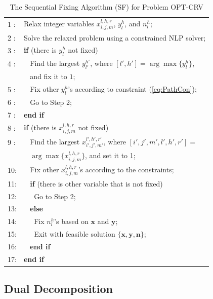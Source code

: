 \documentclass[12pt,onecolumn,draftclsnofoot]{IEEEtran} %
\begin{document}
\begin{table}[!t]
\begin{center}
\caption{The Sequential Fixing Algorithm (SF) for Problem OPT-CRV}
\begin{tabular}{ll}
\hline
1 : & Relax integer variables $x_{i,j,m}^{l,h,r}$, $y_l^h$, and $n_l^h$; \\ 
2 : & Solve the relaxed problem using a constrained NLP solver; \\ 
3 : & {\bf if} (there is $y_l^h$ not fixed) \\
4 : & $\;\;$ Find the largest $y_{l'}^{h'}$, where $[l',h']=\arg \max\{y_l^h\}$, \\
    & $\;\;$ and fix it to $1$; \\
5 : & $\;\;$ Fix other $y_l^h$'s according to constraint (\ref{eq:PathCon}); \\
6 : & $\;\;$ Go to Step 2; \\ 
7 : & {\bf end if} \\
8 : & {\bf if} (there is $x_{i,j,m}^{l,h,r}$ not fixed) \\
9 : & $\;\;$ Find the largest $x_{i',j',m'}^{l',h',r'}$, where $[i',j',m',l',h',r']=$ \\
    & $\;\;$ $\arg \max\{x_{i,j,m}^{l,h,r}\}$, and set it to 1; \\
10: & $\;\;$ Fix other $x_{i,j,m}^{l,h,r}$'s according to the constraints; \\
11: & $\;\;$ {\bf if} (there is other variable that is not fixed) \\
12: & $\;\;\;\;$ Go to Step 2; \\
13: & $\;\;$ {\bf else} \\
14: & $\;\;\;\;$ Fix $n_l^h$'s based on $\mathbf{x}$ and $\mathbf{y}$; \\
15: & $\;\;\;\;$ Exit with feasible solution $\{\mathbf{x}, \mathbf{y},\mathbf{n}\}$; \\
16: & $\;\;$ {\bf end if} \\
17: & {\bf end if} \\
\hline
\end{tabular}
\label{tab:CentrialAlgo}
\end{center}
\end{table}


\subsection{Dual Decomposition \label{sec:dual}}
\end{document}
